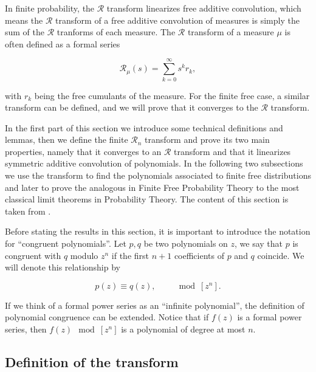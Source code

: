In finite probability, the $\mathcal R$ transform linearizes free additive convolution, which means the $\mathcal R$ transform of a free additive convolution of measures is simply the sum of the $\mathcal R$ tranforms of each measure. The $\mathcal R$ transform of a measure $\mu$ is often defined as a formal series

\begin{equation*}
    \mathcal R_\mu(s) = \sum_{k=0}^\infty s^{k} r_k,
\end{equation*}

\noindent with $r_k$ being the free cumulants of the measure. For the finite free case, a similar transform can be defined, and we will prove that it converges to the $\mathcal R$ transform. %

In the first part of this section we introduce some technical definitions and lemmas, then we define the finite $\mathcal R_n$ transform and prove its two main properties, namely that it converges to an $\mathcal R$ transform and that it linearizes symmetric additive convolution of polynomials. In the following two subsections we use the transform to find the polynomials associated to finite free distributions and later to prove the analogous in Finite Free Probability Theory to the most classical limit theorems in Probability Theory. The content of this section is taken from \cite{article:marcus_finite}.

Before stating the results in this section, it is important to introduce the notation for ``congruent polynomials''. Let $p,q$ be two polynomials on $z$, we say that $p$ is congruent with $q$ modulo $z^{n}$ if the first $n+1$ coefficients of $p$ and $q$ coincide. We will denote this relationship by

\begin{equation*}
    p(z) \equiv q(z), \qquad \mod [z^n].
\end{equation*}

If we think of a formal power series as an ``infinite polynomial'', the definition of polynomial congruence can be extended. Notice that if $f(z)$ is a formal power series, then $f(z) \mod [z^n]$ is a polynomial of degree at most $n$.

\subsection{Definition of the transform}

